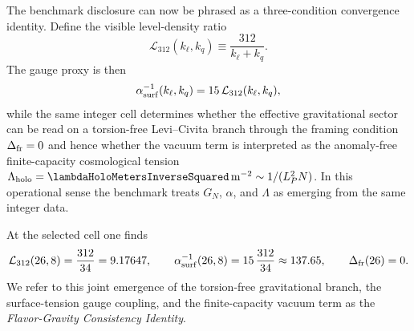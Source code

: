 \documentclass[11pt]{article}
\begin{document}
The benchmark disclosure can now be phrased as a three-condition convergence identity. Define the
visible level-density ratio
\begin{equation}
 \mathcal L_{312}(k_{\ell},k_q)
 \equiv
 \frac{312}{k_{\ell}+k_q}.
\end{equation}
The gauge proxy is then
\begin{equation}
 \alpha^{-1}_{\rm surf}(k_{\ell},k_q)
 =
 15\,\mathcal L_{312}(k_{\ell},k_q),
\end{equation}
while the same integer cell determines whether the effective gravitational
sector can be read on a torsion-free Levi--Civita branch through the framing
condition $\Delta_{\rm fr}=0$ and hence whether the vacuum term is interpreted as
the anomaly-free finite-capacity cosmological tension
$\Lambda_{\rm holo}=\lambdaHoloMetersInverseSquared\,\mathrm{m}^{-2}\sim 1/(L_P^2N)$. In this operational sense the benchmark treats $G_N$, $\alpha$, and
$\Lambda$ as emerging from the same integer data.

At the selected cell one finds
\begin{equation}
 \mathcal L_{312}(26,8)=\frac{312}{34}=9.17647,
 \qquad
 \alpha^{-1}_{\rm surf}(26,8)=15\,\frac{312}{34}\approx 137.65,
 \qquad
 \Delta_{\rm fr}(26)=0.
\end{equation}
We refer to this joint emergence of the torsion-free gravitational branch, the
surface-tension gauge coupling, and the finite-capacity vacuum term as the
\emph{Flavor-Gravity Consistency Identity}.
\end{document}
